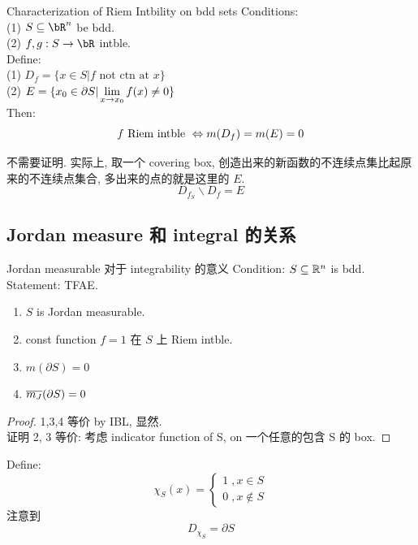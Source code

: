 \begin{theorem}{Characterization of Riem Intbility on bdd sets}\label{Characterization of Riem Intbility on bdd sets}
    Conditions:\\
    (1) $S \sub \bR^n$ be bdd.\\
    (2) $f,g: S\rar \bR$ intble.\\
    Define:\\
    (1) $D_f = \{x \in S | f \text{ not ctn at } x\}$\\
    (2) $E = \{ x_0 \in \partial S  | \displaystyle \lim_{x \rightarrow x_0} f(x) \not = 0 \}$
    \\Then:
    $$
    f \text{ Riem intble } \displaystyle\Leftrightarrow m(D_f) = m(E) = 0
    $$
\end{theorem}
\begin{remark}
    不需要证明. 实际上, 取一个 covering box, 创造出来的新函数的不连续点集比起原来的不连续点集合, 多出来的点的就是这里的 $E$.
    $$
    D_{f_S} \backslash D_f = E
    $$
\end{remark}



\subsection{Jordan measure 和 integral 的关系}
\begin{theorem}{Jordan measurable 对于 integrability 的意义} \label{equivalent conditions for Jordan-mesurability}
    Condition: $S \subseteq \mathbb{R}^n $ is bdd.\\
    Statement: TFAE.
    \begin{enumerate}
        \item $S$ is Jordan measurable.
        \item const function $f = 1$ 在 $S$ 上 Riem intble.
        \item  $m(\partial S) = 0$
        \item  $\overline{m_J}(\partial S) = 0 $
    \end{enumerate}
\end{theorem}
\begin{proof}
    1,3,4 等价 by IBL, 显然.\\
    证明 2, 3 等价: 考虑 indicator function of S, on 一个任意的包含 S 的 box.
\end{proof}

\begin{remark}
Define: 
$$
\chi_S (x) = \begin{cases}
    1 \; , x \in S \\
    0 \; , x \not\in S
\end{cases}
$$
注意到
$$
D_{\chi_S} = \partial S
$$
\end{remark}


